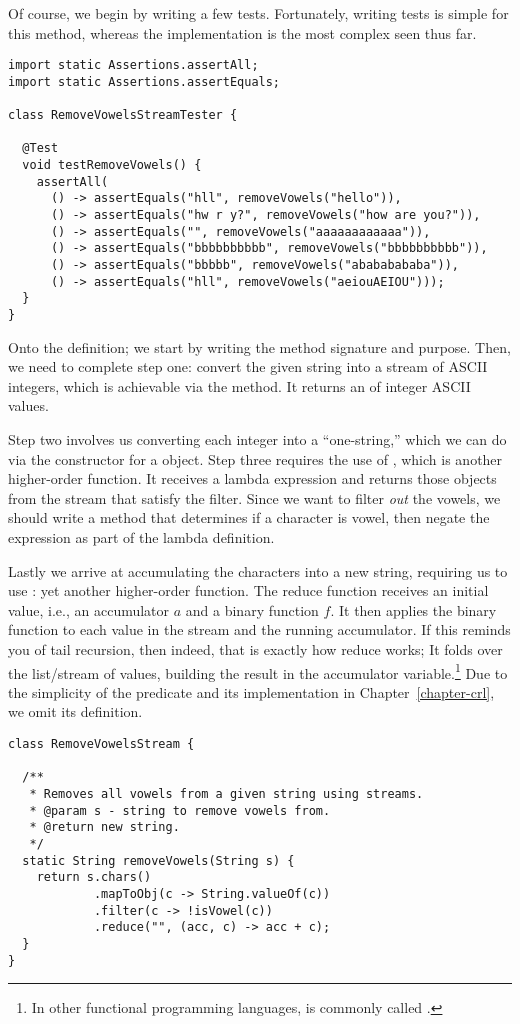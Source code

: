 Of course, we begin by writing a few tests. Fortunately, writing tests is simple for this method, whereas the implementation is the most complex seen thus far.

\begin{lstlisting}[language=MyJava]
import static Assertions.assertAll;
import static Assertions.assertEquals;

class RemoveVowelsStreamTester {
  
  @Test
  void testRemoveVowels() {
    assertAll(
      () -> assertEquals("hll", removeVowels("hello")),
      () -> assertEquals("hw r y?", removeVowels("how are you?")),
      () -> assertEquals("", removeVowels("aaaaaaaaaaaa")),
      () -> assertEquals("bbbbbbbbbb", removeVowels("bbbbbbbbbb")),
      () -> assertEquals("bbbbb", removeVowels("abababababa")),
      () -> assertEquals("hll", removeVowels("aeiouAEIOU")));
  }
}
\end{lstlisting}

Onto the definition; we start by writing the method signature and purpose. Then, we need to complete step one: convert the given string into a stream of ASCII integers, which is achievable via the  method. It returns an  of integer ASCII values. 

Step two involves us converting each integer into a ``one-string,'' which we can do via the constructor for a  object. Step three requires the use of , which is another higher-order function. It receives a lambda expression and returns those objects from the stream that satisfy the filter. Since we want to filter \emph{out} the vowels, we should write a method that determines if a character is vowel, then negate the expression as part of the lambda definition. 

Lastly we arrive at accumulating the characters into a new string, requiring us to use : yet another higher-order function. The reduce function receives an initial value, i.e., an accumulator $a$ and a binary function $f$. It then applies the binary function to each value in the stream and the running accumulator. If this reminds you of tail recursion, then indeed, that is exactly how reduce works; It folds over the list/stream of values, building the result in the accumulator variable.\footnote{In other functional programming languages,  is commonly called .} Due to the simplicity of the  predicate and its implementation in Chapter~\ref{chapter-crl}, we omit its definition.
\begin{lstlisting}[language=MyJava]
class RemoveVowelsStream {

  /**
   * Removes all vowels from a given string using streams.
   * @param s - string to remove vowels from.
   * @return new string.
   */
  static String removeVowels(String s) {
    return s.chars()
            .mapToObj(c -> String.valueOf(c))
            .filter(c -> !isVowel(c))
            .reduce("", (acc, c) -> acc + c);
  }
}
\end{lstlisting}

